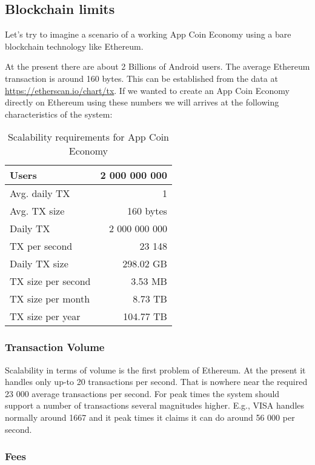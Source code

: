 \subsection{Blockchain limits}


Let's try to imagine a scenario of a working App Coin Economy using a bare blockchain technology like Ethereum.

At the present there are about 2 Billions of Android users. The average Ethereum transaction is around 160 bytes. This can be established from the data at \url{https://etherscan.io/chart/tx}. If we wanted to create an App Coin Economy directly on Ethereum using these numbers we will arrives at the following characteristics of the system:

\begin{table}[h]
\centering
\begin{tabular}{|l|r|}
\hline
Users              & 2 000 000 000    \\ \hline
Avg. daily TX      & 1                \\ \hline
Avg. TX size       & 160 bytes        \\ \hline
Daily TX           & 2 000 000 000    \\ \hline
TX per second      & 23 148           \\ \hline
Daily TX size      & 298.02 GB        \\ \hline
TX size per second & 3.53 MB          \\ \hline
TX size per month  & 8.73 TB          \\ \hline
TX size per year   & 104.77 TB        \\ \hline
\end{tabular}
\caption{Scalability requirements for App Coin Economy}
\end{table}


\subsubsection{Transaction Volume}
Scalability in terms of volume is the first problem of Ethereum. At the present it handles only up-to 20 transactions per second\cite{eth_scaling}. That is nowhere near the required 23 000 average transactions per second. For peak times the system should support a number of transactions several magnitudes higher. E.g., VISA handles normally around 1667 and it peak times it claims it can do around 56 000 per second\cite{eth_scaling}.

\subsubsection{Fees}

